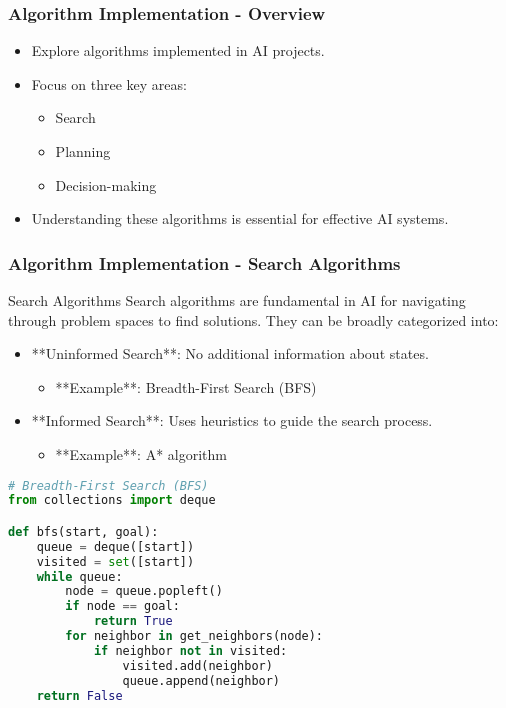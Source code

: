 \documentclass[aspectratio=169]{beamer}
\begin{document}
\begin{frame}
    \frametitle{Algorithm Implementation - Overview}
    \begin{itemize}
        \item Explore algorithms implemented in AI projects.
        \item Focus on three key areas:
        \begin{itemize}
            \item Search
            \item Planning
            \item Decision-making
        \end{itemize}
        \item Understanding these algorithms is essential for effective AI systems.
    \end{itemize}
\end{frame}

\begin{frame}[fragile]
    \frametitle{Algorithm Implementation - Search Algorithms}
    \begin{block}{Search Algorithms}
        Search algorithms are fundamental in AI for navigating through problem spaces to find solutions. They can be broadly categorized into:
        \begin{itemize}
            \item **Uninformed Search**: No additional information about states.
            \begin{itemize}
                \item **Example**: Breadth-First Search (BFS)
            \end{itemize}
            \item **Informed Search**: Uses heuristics to guide the search process.
            \begin{itemize}
                \item **Example**: A* algorithm
            \end{itemize}
        \end{itemize}
    \end{block}
    
    \begin{lstlisting}[language=Python]
# Breadth-First Search (BFS)
from collections import deque

def bfs(start, goal):
    queue = deque([start])
    visited = set([start])
    while queue:
        node = queue.popleft()
        if node == goal:
            return True
        for neighbor in get_neighbors(node):
            if neighbor not in visited:
                visited.add(neighbor)
                queue.append(neighbor)
    return False
    \end{lstlisting}
\end{frame}
\end{document}
